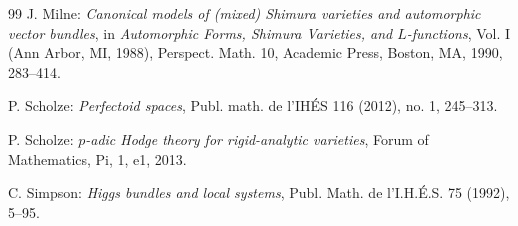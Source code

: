 \begin{thebibliography}{99}
J. Milne: \textit{Canonical models of (mixed) Shimura varieties and automorphic vector bundles},
in \textit{Automorphic Forms, Shimura Varieties, and $L$-functions}, Vol. I
(Ann Arbor, MI, 1988), Perspect. Math. 10, Academic Press, Boston, MA, 1990, 283--414.

P. Scholze: \textit{Perfectoid spaces}, Publ. math. de l'IH\'ES 116 (2012), no. 1, 245--313.

P. Scholze: \textit{$p$-adic Hodge theory for rigid-analytic varieties},
Forum of Mathematics, Pi, 1, e1, 2013.

C. Simpson: \textit{Higgs bundles and local systems},
Publ. Math. de l'I.H.\'E.S. 75 (1992), 5--95.

\end{thebibliography}
